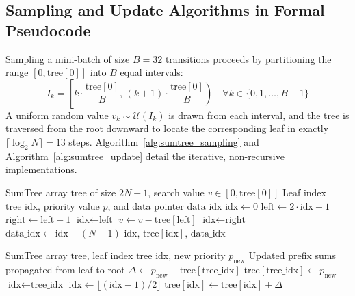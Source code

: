 \subsection{Sampling and Update Algorithms in Formal Pseudocode}
Sampling a mini-batch of size $B=32$ transitions proceeds by partitioning the range $[0, \text{tree}[0]]$ into $B$ equal intervals:
\begin{equation}
    I_k = \left[ k \cdot \frac{\text{tree}[0]}{B}, \, (k + 1) \cdot \frac{\text{tree}[0]}{B} \right) \quad \forall k \in \{0, 1, \dots, B-1\}
\end{equation}
A uniform random value $v_k \sim \mathcal{U}(I_k)$ is drawn from each interval, and the tree is traversed from the root downward to locate the corresponding leaf in exactly $\lceil \log_2 N \rceil = 13$ steps. Algorithm~\ref{alg:sumtree_sampling} and Algorithm~\ref{alg:sumtree_update} detail the iterative, non-recursive implementations.

\begin{algorithm}[htbp]
\caption{Iterative Non-Recursive Binary SumTree Retrieval}
\label{alg:sumtree_sampling}
\begin{algorithmic}[1]
\REQUIRE SumTree array $\text{tree}$ of size $2N - 1$, search value $v \in [0, \text{tree}[0]]$
\ENSURE Leaf index $\text{tree\_idx}$, priority value $p$, and data pointer $\text{data\_idx}$
\STATE $\text{idx} \gets 0$ 
 
    \STATE $\text{left} \gets 2 \cdot \text{idx} + 1$
    \STATE $\text{right} \gets \text{left} + 1$
        \STATE $\text{idx} \gets \text{left}$
    \ELSE
        \STATE $v \gets v - \text{tree}[\text{left}]$
        \STATE $\text{idx} \gets \text{right}$
    \ENDIF
\ENDWHILE
\STATE $\text{data\_idx} \gets \text{idx} - (N - 1)$
\RETURN $\text{idx}, \, \text{tree}[\text{idx}], \, \text{data\_idx}$
\end{algorithmic}
\end{algorithm}

\begin{algorithm}[htbp]
\caption{Iterative Non-Recursive Binary SumTree Priority Update}
\label{alg:sumtree_update}
\begin{algorithmic}[1]
\REQUIRE SumTree array $\text{tree}$, leaf index $\text{tree\_idx}$, new priority $p_{\text{new}}$
\ENSURE Updated prefix sums propagated from leaf to root
\STATE $\Delta \gets p_{\text{new}} - \text{tree}[\text{tree\_idx}]$ 
\STATE $\text{tree}[\text{tree\_idx}] \gets p_{\text{new}}$
\STATE $\text{idx} \gets \text{tree\_idx}$
 
    \STATE $\text{idx} \gets \lfloor (\text{idx} - 1) / 2 \rfloor$ 
    \STATE $\text{tree}[\text{idx}] \gets \text{tree}[\text{idx}] + \Delta$
\ENDWHILE
\end{algorithmic}
\end{algorithm}

